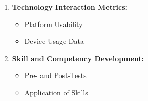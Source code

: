 \begin{enumerate}
    \item \textbf{Technology Interaction Metrics:}
    \begin{itemize}
        \item Platform Usability
        \item Device Usage Data
    \end{itemize}

    \item \textbf{Skill and Competency Development:}
    \begin{itemize}
        \item Pre- and Post-Tests
        \item Application of Skills
    \end{itemize}
\end{enumerate}




